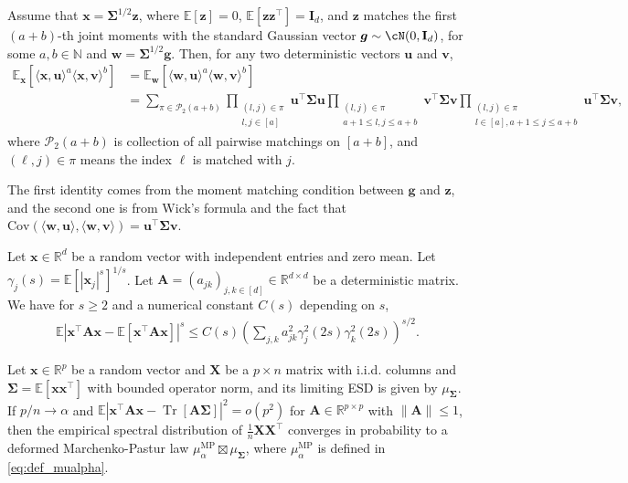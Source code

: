 \documentclass[twoside,11pt]{article}
\newcommand{\bw}{\boldsymbol{w}}
\newcommand{\E}{\mathbb{E}}
\newcommand{\N}{\mathbb{N}}
\def\bI{{\mathbf I}}
\def\bA{{\boldsymbol A}}
\def\bX{{\boldsymbol X}}
\def\bg{{\boldsymbol g}}
\def\bu{{\boldsymbol u}}
\def\bv{{\boldsymbol v}}
\def\bw{{\boldsymbol w}}
\def\bx{{\boldsymbol x}}
\def\bz{{\boldsymbol z}}
\def\bSigma{{\boldsymbol \Sigma}}
\def\cP{{\mathcal P}}
\def\cP{{\mathcal P}}
\newcommand{\Tr}{\operatorname{Tr}}
\newcommand{\w}{\mbi{w}}
\newcommand{\1}{\mathbf{1}}
\def\mbi#1{\boldsymbol{#1}}
\def\mbi#1{\boldsymbol{#1}} %
\newenvironment{proofoflemma}[1]{\par\noindent{\bf Proof of Lemma #1\ }}{\hfill\BlackBox\\[2mm]}
\begin{document}
\begin{lemma}\label{lemm:wick}
Assume that $\bx=\bSigma^{1/2}\bz$, where $\E[\bz]=0$, $\E[\bz\bz^\top]=\bI_{d}$,  and $\bz$ matches the first $(a+b)$-th joint moments with the standard Gaussian vector $\bg\sim \cN(0,\bI_d)$, for some $a,b\in\N$ and $\w=\bSigma^{1/2}\bg$. Then, for any two deterministic vectors $\bu$ and $\bv$, 
\begin{align}
\E_{\bx}[\langle \bx,\bu\rangle^a  \langle \bx,\bv\rangle^b]&=\E_{\bw}[\langle \bw,\bu\rangle^a  \langle \bw,\bv\rangle^b]\\
&=\sum_{\pi\in\cP_2(a+b)}\prod_{\substack{(l,j)\in\pi\\ l,j\in [a]}}\bu^\top\bSigma\bu \prod_{\substack{(l,j)\in\pi\\ a+1\leq l,j\leq a+b }}\bv^\top\bSigma\bv \prod_{\substack{(l,j)\in\pi\\ l\in [a], a+1\leq j\leq a+b}}\bu^\top\bSigma\bv,
\end{align}
where $\cP_2(a+b)$ is collection of all pairwise matchings on  $[a+b]$, and $(\ell,j)\in \pi$ means the index $\ell$ is matched with $j$.
\end{lemma}

\begin{proofoflemma}{\ref{lemm:wick}}
    The first identity comes from the moment matching condition between $\bg$ and $\bz$, and the second one is from Wick's formula \citep{wick1950evaluation} and the fact that
$\text{Cov}(\langle \bw,\bu\rangle, \langle \bw,\bv\rangle)= \bu^\top \bSigma\bv.$ 
\end{proofoflemma}

\begin{lemma}\label{lem:quadratic_moments}
 Let $\bx\in \mathbb R^d$ be a random vector with independent entries and zero mean. Let $\gamma_{j}(s)=\mathbb E[|\bx_j|^s]^{1/s}$. Let $\bA=(a_{jk})_{j,k\in [d]}\in \mathbb R^{d\times d}$ be a deterministic matrix. We have for $s\geq 2$  and  a numerical constant $C(s)$ depending on $s$,
 \begin{align}
     \E| \bx^\top \bA \bx -\E [\bx^\top \bA \bx]|^{s}\leq C(s) \left( \sum_{j,k} a_{jk}^2 \gamma_j^2(2s) \gamma_k^2(2s)\right)^{s/2}.
 \end{align}
\end{lemma}



\begin{lemma}\label{lem:BaiZhou}
Let $\bx\in \mathbb R^p$ be a random vector and $\bX$ be a $p\times n$ matrix with i.i.d. columns and $\bSigma=\mathbb E [\bx\bx^\top]$ with bounded operator norm, and its limiting ESD is given by $\mu_{\bSigma}$. If $p/n\to\alpha$ and 
 $\mathbb E\left|\bx^\top \bA\bx-\Tr[\bA\bSigma]\right|^2=o(p^2)$
for $\bA\in \mathbb R^{p\times p}$ with $\|\bA\|\leq 1$,
then the empirical spectral distribution of $\frac{1}{n} \bX \bX^\top$ converges in probability to a deformed Marchenko-Pastur law $\mu_{\alpha}^{\mathrm{MP}}\boxtimes \mu_{\bSigma}$, where $\mu_{\alpha}^{\mathrm{MP}}$ is defined in \eqref{eq:def_mualpha}.
\end{lemma}
\end{document}
